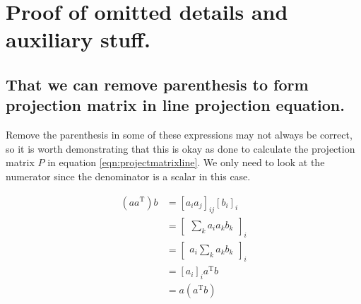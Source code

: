 \documentclass{article}      %
\newcommand{\transpose}[1]{{{#1}^{\text{T}}}}
\begin{document}
%
%
%
%
%
%
%
%
%
%






\section{ Proof of omitted details and auxiliary stuff. }

\subsection{ That we can remove parenthesis to form projection matrix in line projection equation. }

Remove the parenthesis in some of these expressions may not always be correct, so it is worth demonstrating that this is okay as
done to calculate the projection matrix $P$ in 
equation \ref{eqn:projectmatrixline}.
We only need to look at the numerator since the denominator is a scalar in this case.

\begin{align*}
(a \transpose{a}) b
&= [ a_i a_j ]_{ij} [b_i]_i \\
&= 
{\begin{bmatrix}
\sum_k a_i a_k b_k
\end{bmatrix}
}_i \\
&= 
{\begin{bmatrix}
a_i \sum_k a_k b_k
\end{bmatrix}
}_i \\
&= [ a_i ]_i \transpose{a} b \\
&= a (\transpose{a} b) \\
\end{align*}
\end{document}
